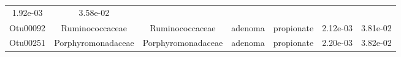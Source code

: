 \documentclass[11pt,]{article}
\begin{document}
\begin{longtable}[]{@{}ccccccc@{}}
\begin{minipage}[t]{0.09\columnwidth}
1.92e-03\strut
\end{minipage} & \begin{minipage}[t]{0.09\columnwidth}\centering\strut
3.58e-02\strut
\end{minipage}\tabularnewline
\begin{minipage}[t]{0.09\columnwidth}\centering\strut
Otu00092\strut
\end{minipage} & \begin{minipage}[t]{0.17\columnwidth}\centering\strut
Ruminococcaceae\strut
\end{minipage} & \begin{minipage}[t]{0.17\columnwidth}\centering\strut
Ruminococcaceae\strut
\end{minipage} & \begin{minipage}[t]{0.09\columnwidth}\centering\strut
adenoma\strut
\end{minipage} & \begin{minipage}[t]{0.11\columnwidth}\centering\strut
propionate\strut
\end{minipage} & \begin{minipage}[t]{0.09\columnwidth}\centering\strut
2.12e-03\strut
\end{minipage} & \begin{minipage}[t]{0.09\columnwidth}\centering\strut
3.81e-02\strut
\end{minipage}\tabularnewline
\begin{minipage}[t]{0.09\columnwidth}\centering\strut
Otu00251\strut
\end{minipage} & \begin{minipage}[t]{0.17\columnwidth}\centering\strut
Porphyromonadaceae\strut
\end{minipage} & \begin{minipage}[t]{0.17\columnwidth}\centering\strut
Porphyromonadaceae\strut
\end{minipage} & \begin{minipage}[t]{0.09\columnwidth}\centering\strut
adenoma\strut
\end{minipage} & \begin{minipage}[t]{0.11\columnwidth}\centering\strut
propionate\strut
\end{minipage} & \begin{minipage}[t]{0.09\columnwidth}\centering\strut
2.20e-03\strut
\end{minipage} & \begin{minipage}[t]{0.09\columnwidth}\centering\strut
3.82e-02\strut
\end{minipage}\tabularnewline

\end{longtable}
\end{document}
